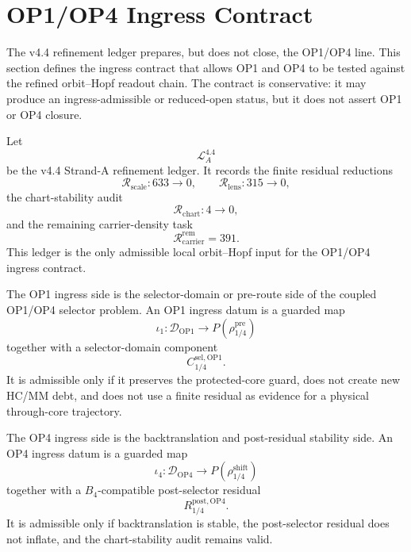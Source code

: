 
\section{OP1/OP4 Ingress Contract}
\label{sec:v44-op1-op4-ingress-contract}

The v4.4 refinement ledger prepares, but does not close, the OP1/OP4 line.
This section defines the ingress contract that allows OP1 and OP4 to be tested
against the refined orbit--Hopf readout chain.  The contract is conservative:
it may produce an ingress-admissible or reduced-open status, but it does not
assert OP1 or OP4 closure.

\begin{definition}
Let
\[
    \mathcal L_A^{4.4}
\]
be the v4.4 Strand-A refinement ledger.  It records the finite residual
reductions
\[
    \mathcal R_{\mathrm{scale}}: 633\to0,\qquad
    \mathcal R_{\mathrm{lens}}:315\to0,
\]
the chart-stability audit
\[
    \mathcal R_{\mathrm{chart}}:4\to0,
\]
and the remaining carrier-density task
\[
    \mathcal R_{\mathrm{carrier}}^{\mathrm{rem}}=391.
\]
This ledger is the only admissible local orbit--Hopf input for the OP1/OP4
ingress contract.
\end{definition}

\begin{definition}
The OP1 ingress side is the selector-domain or pre-route side of the coupled
OP1/OP4 selector problem.  An OP1 ingress datum is a guarded map
\[
    \iota_1:\mathcal D_{\mathrm{OP1}}
    \longrightarrow
    P(\rho_{1/4}^{\mathrm{pre}})
\]
together with a selector-domain component
\[
    C_{1/4}^{\mathrm{sel,OP1}}.
\]
It is admissible only if it preserves the protected-core guard, does not create
new HC/MM debt, and does not use a finite residual as evidence for a physical
through-core trajectory.
\end{definition}

\begin{definition}
The OP4 ingress side is the backtranslation and post-residual stability side.
An OP4 ingress datum is a guarded map
\[
    \iota_4:\mathcal D_{\mathrm{OP4}}
    \longrightarrow
    P(\rho_{1/4}^{\mathrm{shift}})
\]
together with a \(B_4\)-compatible post-selector residual
\[
    R_{1/4}^{\mathrm{post,OP4}}.
\]
It is admissible only if backtranslation is stable, the post-selector residual
does not inflate, and the chart-stability audit remains valid.
\end{definition}

